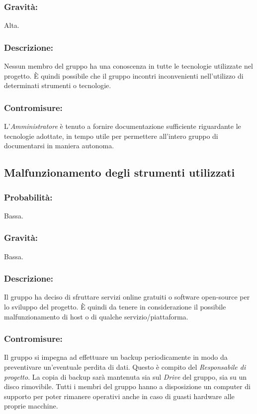 \documentclass[a4paper]{report}
\begin{document}
				\subsubsection{Gravità:}
					Alta.
				\subsubsection{Descrizione:}
					Nessun membro del gruppo ha una conoscenza in tutte le tecnologie utilizzate nel 
					progetto. È quindi possibile che il gruppo incontri inconvenienti nell'utilizzo 
					di determinati strumenti o tecnologie.
				\subsubsection{Contromisure:}
					L'\emph{Amministratore} è tenuto a fornire documentazione sufficiente riguardante 
					le tecnologie adottate, in tempo utile per permettere all'intero gruppo di documentarsi 
					in maniera autonoma.
			\subsection{Malfunzionamento degli strumenti utilizzati}
				\subsubsection{Probabilità:}
					Bassa.
				\subsubsection{Gravità:}
					Bassa.
				\subsubsection{Descrizione:}
					Il gruppo ha deciso di sfruttare servizi online gratuiti o software open-source per lo 
					sviluppo del progetto. È quindi da tenere in considerazione il possibile malfunzionamento 
					di host o di qualche servizio/piattaforma.
				\subsubsection{Contromisure:}
					Il gruppo si impegna ad effettuare un backup periodicamente in modo da preventivare un'eventuale 
					perdita di dati. Questo è compito del \emph{Responsabile di progetto}. La copia di backup sarà mantenuta 
					sia sul \emph{Drive} del gruppo, sia su un disco rimovibile. Tutti i membri del gruppo hanno a disposizione 
					un computer di supporto per poter rimanere operativi anche in caso di guasti hardware alle proprie macchine.
\end{document}
